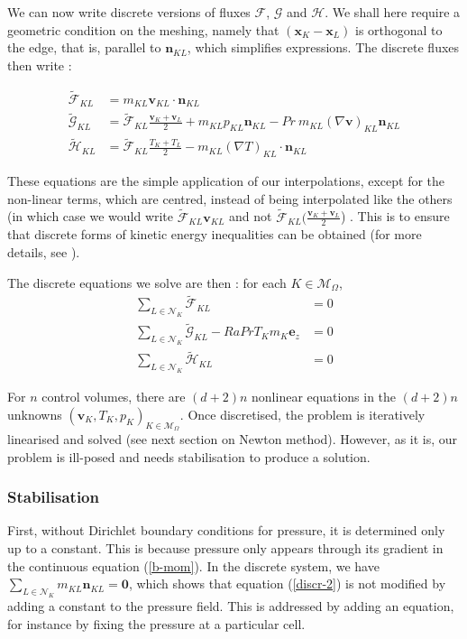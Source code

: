 \documentclass[12pt]{article}
\newcommand{\vb}[1]{\ensuremath{\boldsymbol #1}}
\begin{document}
We can now write discrete versions of fluxes $\mathcal F$, $\mathcal
G$ and $\mathcal H$. We shall here require a geometric condition on
the meshing, namely that $(\vb{x}_{K} - \vb{x_{L}})$ is orthogonal to
the edge, that is, parallel to $\vb{n}_{KL}$, which simplifies
expressions. The discrete fluxes then write :

\begin{align}
  \tilde{\mathcal{F}}_{KL} &= m_{KL} \vb{v}_{KL} \cdot \vb{n}_{KL}\\
  \tilde{\mathcal{G}}_{KL} &= \tilde{\mathcal F}_{KL} \frac{\vb{v}_{K} + \vb{v}_{L}}{2}
  + m_{KL} p_{KL} \vb{n}_{KL}
  - Pr  \ m_{KL} (\nabla \vb{v})_{KL} \vb{n}_{KL}\\
  \tilde{\mathcal{H}}_{KL} &= \tilde{\mathcal F}_{KL} \frac{T_{K} + T_{L}} {2}
  - m_{KL} (\nabla T)_{KL} \cdot \vb{n}_{KL}
\end{align}

These equations are the simple application of our interpolations,
except for the non-linear terms, which are centred, instead of being
interpolated like the others (in which case we would write
$\tilde{\mathcal F}_{KL} \vb{v}_{KL}$ and not $\tilde{\mathcal F}_{KL}
(\frac{\vb{v}_{K} + \vb{v}_{L}}{2}$) . This is to ensure that discrete
forms of kinetic energy inequalities can be obtained (for more
details, see \cite{che-06-num}).

The discrete equations we solve are then : for each $K \in \mathcal
M_{\Omega}$, 
\begin{align}
  \label{discr-1}
  \sum_{L \in \mathcal{N}_K} \tilde{\mathcal{F}}_{KL} &= 0\\
  \label{discr-2}
  \sum_{L \in \mathcal{N}_K} \tilde{\mathcal{G}}_{KL} - Ra Pr T_{K}
  m_K \vb{e_{z}} &= 0\\
  \label{discr-3}
  \sum_{L \in \mathcal{N}_K} \tilde{\mathcal{H}}_{KL} &= 0
\end{align}

For $n$ control volumes, there are $(d+2)n$ nonlinear equations in the
$(d+2)n$ unknowns $(\vb{v}_{K}, T_{K}, p_{K})_{K \in \mathcal
  M_{\Omega}}$. Once discretised, the problem is iteratively linearised and solved
(see next section on Newton method). However, as it is, our problem is
ill-posed and needs stabilisation to produce a solution.

\subsubsection{Stabilisation}
First, without Dirichlet boundary conditions for pressure, it is
determined only up to a constant. This is because pressure only
appears through its gradient in the continuous equation
(\ref{b-mom}). In the discrete system, we have $\sum_{L \in
  \mathcal{N}_{K}} m_{KL} \vb{n}_{KL} = \vb{0}$, which shows that
equation (\ref{discr-2}) is not modified by adding a constant to the
pressure field. This is addressed by adding an equation, for instance
by fixing the pressure at a particular cell.
\end{document}
